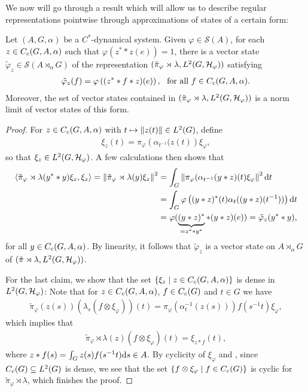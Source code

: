 We now will go through a result which will allow us to describe regular representations pointwise through approximations of states of a certain form:
\begin{proposition}
Let $(A,G,\alpha)$ be a $C^*$-dynamical system. Given $\varphi \in \mathcal{S}(A)$, for each $z \in C_c(G,A,\alpha)$ such that $\varphi(z^* \ast z(e)) = 1$, there is a vector state $\tilde \varphi_z \in \mathcal{S}(A \rtimes_\alpha G)$ of the representation $(\tilde \pi_{\varphi} \rtimes \lambda , L^2(G,\mathcal{H}_\varphi))$ satisfying
\begin{align*}
	\tilde \varphi_z (f) =\varphi\left( (z^* \ast f \ast z)(e) \right), \ \text{ for all } f \in C_c(G,A,\alpha).
\end{align*}
Moreover, the set of vector states contained in $(\tilde \pi_{\varphi} \rtimes \lambda , L^2(G,\mathcal{H}_\varphi))$ is a norm limit of vector states of this form.
\label{mult:vectorstateapprox}
\end{proposition}
\begin{proof}
For $z \in C_c(G,A,\alpha)$ with $t \mapsto \left\lVert z(t) \right\rVert \in L^2(G)$, define
\begin{align*}
	\xi_z(t) = \pi_{\varphi}\left( \alpha_{t^{-1}}(z(t) \right)\xi_\varphi,
\end{align*}
so that $\xi_z \in L^2(G,\mathcal{H}_\varphi)$. A few calculations then shows that 
\begin{align*}
	\langle \tilde \pi_\varphi \rtimes \lambda (y^* \ast y) \xi_z , \xi_z \rangle  = \left\lVert \tilde \pi_\varphi \rtimes \lambda(y) \xi_z \right\rVert ^2 &= \int_G \left\lVert  \pi_\varphi ( \alpha_{t^{-1}}(y \ast z)(t) \xi_\varphi \right\rVert^2 \mathrm{d} t \\
	&=\int_G \varphi\left( (y \ast z)^*(t) \alpha_t( (y \ast z)( t^{-1}) ) \right) \mathrm{d} t \\
	&= \varphi ( \underbrace{(y  \ast z )^*}_{= z^* \ast y^*} \ast (y \ast z) (e)) = \tilde\varphi_{z} (y^* \ast y),
\end{align*}
for all $y \in C_c(G,A,\alpha)$. By linearity, it follows that $\tilde \varphi_z$ is a vector state on $A \rtimes_\alpha G$ of $(\tilde \pi \rtimes \lambda, L^2(G,\mathcal{H}_\varphi))$.

For the last claim, we show that the set $\{ \xi_z \mid z \in C_c(G,A,\alpha)\}$ is dense in $L^2(G,\mathcal{H}_\varphi)$: Note that for $z \in C_c(G,A,\alpha)$, $f \in C_c(G)$ and $t \in G$ we have
\begin{align*}
	\tilde \pi_\varphi(z(s)) (\lambda_s (f \otimes \xi_\varphi))(t) = \pi_\varphi(\alpha_t^{-1}(z(s)))f(s^{-1}t) \xi_\varphi,
\end{align*}
which implies that 
\begin{align*}
	\tilde \pi_\varphi \rtimes \lambda (z) (f \otimes \xi_\varphi) (t) = \xi_{z \ast f}(t),
\end{align*}
where $z \ast f(s) = \int_G z(s) f(s^{-1}t) \mathrm{d} s \in A$.  By cyclicity of $\xi_\varphi$ and , since $C_c(G) \subseteq L^2(G)$ is dense, we see that the set $\{ f \otimes \xi_\varphi \mid f \in C_c(G)\}$ is cyclic for $\tilde \pi_\varphi \rtimes \lambda$, which finishes the proof.
\end{proof}


